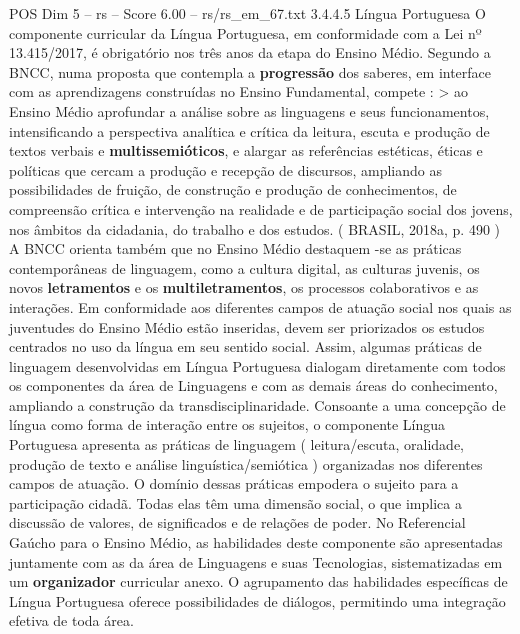 \begin{textsample}{POS Dim 5 – rs – Score 6.00 – rs/rs\_em\_67.txt}  \label{ex:f5_pos_265}
3.4.4.5 Língua Portuguesa O componente curricular da Língua Portuguesa, em conformidade com a Lei nº 13.415/2017, é obrigatório nos três anos da etapa do Ensino Médio.
Segundo a BNCC, numa proposta que contempla a \textbf{progressão} dos saberes, em interface com as aprendizagens construídas no Ensino Fundamental, compete : > ao Ensino Médio aprofundar a análise sobre as linguagens e seus funcionamentos, intensificando a perspectiva analítica e crítica da leitura, escuta e produção de textos verbais e \textbf{multissemióticos}, e alargar as referências estéticas, éticas e políticas que cercam a produção e recepção de discursos, ampliando as possibilidades de fruição, de construção e produção de conhecimentos, de compreensão crítica e intervenção na realidade e de participação social dos jovens, nos âmbitos da cidadania, do trabalho e dos estudos. ( BRASIL, 2018a, p. 490 ) A BNCC orienta também que no Ensino Médio destaquem -se as práticas contemporâneas de linguagem, como a cultura digital, as culturas juvenis, os novos \textbf{letramentos} e os \textbf{multiletramentos}, os processos colaborativos e as interações.
Em conformidade aos diferentes campos de atuação social nos quais as juventudes do Ensino Médio estão inseridas, devem ser priorizados os estudos centrados no uso da língua em seu sentido social.
Assim, algumas práticas de linguagem desenvolvidas em Língua Portuguesa dialogam diretamente com todos os componentes da área de Linguagens e com as demais áreas do conhecimento, ampliando a construção da transdisciplinaridade.
Consoante a uma concepção de língua como forma de interação entre os sujeitos, o componente Língua Portuguesa apresenta as práticas de linguagem ( leitura/escuta, oralidade, produção de texto e análise linguística/semiótica ) organizadas nos diferentes campos de atuação.
O domínio dessas práticas empodera o sujeito para a participação cidadã.
Todas elas têm uma dimensão social, o que implica a discussão de valores, de significados e de relações de poder.
No Referencial Gaúcho para o Ensino Médio, as habilidades deste componente são apresentadas juntamente com as da área de Linguagens e suas Tecnologias, sistematizadas em um \textbf{organizador} curricular anexo.
O agrupamento das habilidades específicas de Língua Portuguesa oferece possibilidades de diálogos, permitindo uma integração efetiva de toda área.

\end{textsample}
